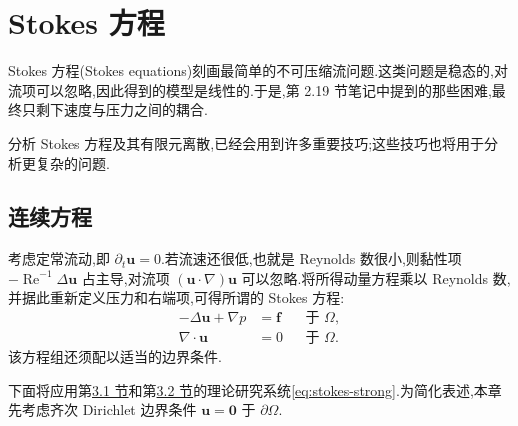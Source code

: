 \chapter{Stokes 方程}\label{chap:stokes}

\begin{note}[动机]\label{note:stokes-motivation}
Stokes 方程(Stokes equations)刻画最简单的不可压缩流问题.这类问题是稳态的,对流项可以忽略,因此得到的模型是线性的.于是,第 2.19 节笔记中提到的那些困难,最终只剩下速度与压力之间的耦合.

分析 Stokes 方程及其有限元离散,已经会用到许多重要技巧;这些技巧也将用于分析更复杂的问题.
\end{note}

\section{连续方程}\label{sec:stokes-continuous-equations}

\begin{note}[Stokes 方程]\label{note:stokes-equations}
考虑定常流动,即 $\partial_t\bm{u}=0$.若流速还很低,也就是 Reynolds 数很小,则黏性项 $-\operatorname{Re}^{-1}\Delta\bm{u}$ 占主导,对流项 $(\bm{u}\cdot\nabla)\bm{u}$ 可以忽略.将所得动量方程乘以 Reynolds 数,并据此重新定义压力和右端项,可得所谓的 Stokes 方程:
\begin{equation}\label{eq:stokes-strong}
\begin{aligned}
  -\Delta\bm{u}+\nabla p&=\bm{f}
       &&\text{于 }\Omega,\\
  \nabla\cdot\bm{u}&=0
       &&\text{于 }\Omega.
\end{aligned}
\end{equation}
该方程组还须配以适当的边界条件.

下面将应用第\hyperref[sec:abstract-saddle-point]{3.1 节}和第\hyperref[sec:continuous-flow-function-spaces]{3.2 节}的理论研究系统\cref{eq:stokes-strong}.为简化表述,本章先考虑齐次 Dirichlet 边界条件 $\bm{u}=\bm{0}$ 于 $\partial\Omega$.
\end{note}

